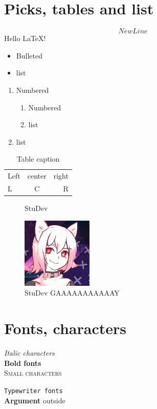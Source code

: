 \documentclass{article}
\begin{document}
    \section{Picks, tables and list}
    $$New Line$$
    Hello \LaTeX!

    \begin{itemize}
        \item Bulleted
        \item list
    \end{itemize}

    \begin{enumerate}
        \item Numbered
        \begin{enumerate}
            \item Numbered
            \item list
        \end{enumerate}
        \item list
    \end{enumerate}

    \begin{table}[bt]
        \caption{Table caption}
        \begin{center}
            \begin{tabular}{|l||cr|}
                \hline
                Left& center & right\\  
                    L&C&R
            \end{tabular}
        \end{center}
    \end{table}

    \begin{figure}[t]
        \caption{StuDev}
        \includegraphics[width=0.3\textwidth]{bottom.png}
        \caption{StuDev GAAAAAAAAAAAY}
    \end{figure}

    {\bfseries
    \section{Fonts, characters}
    \textit{Italic characters}\\
    \textbf{Bold fonts}\\
    \textsc{Small characters}\\}
    \texttt{Typewriter fonts}\\
    {\bfseries Argument} outside
\end{document}
